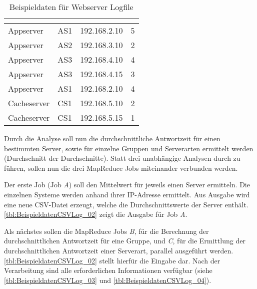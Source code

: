 \begin{table}[h]
	\centering
	\begin{tabular}{| l | l | l | r |}
		\hline
		\rowcolor[HTML]{3531FF} 
		\multicolumn{1}{l|}{\cellcolor[HTML]{4F88BB}{\color[HTML]{FFFFFF} {\bf Serverart}}} & \multicolumn{1}{l|}{\cellcolor[HTML]{4F88BB}{\color[HTML]{FFFFFF} {\bf Gruppe}}} & \multicolumn{1}{l|}{\cellcolor[HTML]{4F88BB}{\color[HTML]{FFFFFF} {\bf IP-Adresse}}} & \multicolumn{1}{l|}{\cellcolor[HTML]{4F88BB}{\color[HTML]{FFFFFF} {\bf Antwortzeit (in Sekunden)}}} \\ \hline
		Appserver & AS1 & 192.168.2.10 & 5 \\ \hline
		Appserver & AS2 & 192.168.3.10 & 2 \\ \hline
		Appserver & AS3 & 192.168.4.10 & 4 \\ \hline
		Appserver & AS3 & 192.168.4.15 & 3 \\ \hline
		Appserver & AS1 & 192.168.2.10 & 4 \\ \hline
		Cacheserver & CS1 & 192.168.5.10 & 2 \\ \hline
		Cacheserver & CS1 & 192.168.5.15 & 1 \\ \hline
	\end{tabular}
	\caption{Beispieldaten für Webserver Logfile}
	\label{tbl:BeispieldatenCSVLog}
\end{table}

Durch die Analyse soll nun die durchschnittliche Antwortzeit für einen bestimmten Server, sowie für einzelne Gruppen und Serverarten ermittelt werden (Durchschnitt der Durchschnitte). Statt drei unabhängige Analysen durch zu führen, sollen nun die drei MapReduce Jobs miteinander verbunden werden.

Der erste Job (Job \textit{A}) soll den Mittelwert für jeweils einen Server ermitteln. Die einzelnen Systeme werden anhand ihrer IP-Adresse ermittelt. Aus Ausgabe wird eine neue CSV-Datei erzeugt, welche die Durchschnittswerte der Server enthält. \autoref{tbl:BeispieldatenCSVLog_02} zeigt die Ausgabe für Job \textit{A}.

Als nächstes sollen die MapReduce Jobs \textit{B}, für die Berechnung der durchschnittlichen Antwortzeit für eine Gruppe, und \textit{C}, für die Ermittlung der durchschnittlichen Antwortzeit einer Serverart, parallel ausgeführt werden. \autoref{tbl:BeispieldatenCSVLog_02} stellt hierfür die Eingabe dar. Nach der Verarbeitung sind alle erforderlichen Informationen verfügbar (siehe \autoref{tbl:BeispieldatenCSVLog_03} und \autoref{tbl:BeispieldatenCSVLog_04}). \\

